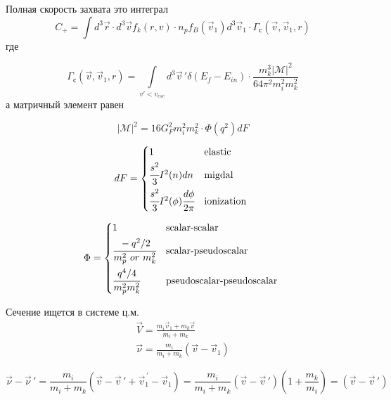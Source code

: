 Полная скорость захвата это интеграл
\begin{equation*}
	\label{eq:capture_rate}
	C_{+} = {\int{d^{3}\vec{r} \cdot d^{3}\vec{v}f_{k}\left( {r,v} \right) \cdot n_{p}f_{B}\left( {\vec{v}}_{1} \right)d^{3}{\vec{v}}_{1} \cdot \Gamma_{с}\left( \vec{v},{\vec{v}}_{1},r \right)}}
\end{equation*}
где

\begin{equation*}
	\label{eq:Gamma_def}
	\Gamma_{с}\left( {\vec{v},{\vec{v}}_{1},r} \right) = {\int\limits_{v' < v_{esc}}{d^{3}{\vec{v}}\,'\delta\left( {E_{f} - E_{in}} \right) \cdot \frac{m_{k}^{3}\left| \mathcal{M} \right|^{2}}{64\pi^{2}m_{i}^{2}m_{k}^{2}}}}
\end{equation*}
а матричный элемент равен

\begin{equation*}
	\left| \mathcal{M} \right|^{2} = 16G_{F}^{2}m_{i}^{2}m_{k}^{2} \cdot \Phi\left( q^{2} \right)dF
\end{equation*}

\begin{equation*}
	dF = \begin{cases*}
		1 &elastic \\
		\cfrac{s^{2}}{3}I^{2}(n)dn & migdal\\
		\cfrac{s^{2}}{3}I^{2}(\phi)\cfrac{d\phi}{2\pi} & ionization
	\end{cases*}
\end{equation*}

\begin{equation*}
	\Phi = \begin{cases*}
		1 & scalar-scalar\\
		\cfrac{- {q^{2}/2}}{m_{p}^{2}~or~m_{k}^{2}} & scalar-pseudoscalar\\
		\cfrac{q^{4}/4}{m_{p}^{2}m_{k}^{2}} & pseudoscalar-pseudoscalar
	\end{cases*}
\end{equation*}

Сечение ищется в системе ц.м. 
\begin{align*}
	\vec{V} = \frac{m_{i}{\vec{v}}_{1} + m_{k}\vec{v}}{m_{i} + m_{k}}\\
	\vec{\nu} = \frac{m_{i}}{m_{i} + m_{k}}\left( {\vec{v} - {\vec{v}}_{1}} \right)
\end{align*}

\begin{equation*}
	\vec{\nu} - {\vec{\nu}}\,' = \frac{m_{i}}{m_{i} + m_{k}}\left( {\vec{v} - {\vec{v}}\,' + \vec{v}_1^{\,\prime}- {\vec{v}}_{1}} \right) = \frac{m_{i}}{m_{i} + m_{k}}\left( {\vec{v} - {\vec{v}}\,'} \right)\left( {1 + \frac{m_{k}}{m_{i}}} \right) = \left( {\vec{v} - {\vec{v}}\,'} \right)
\end{equation*}

